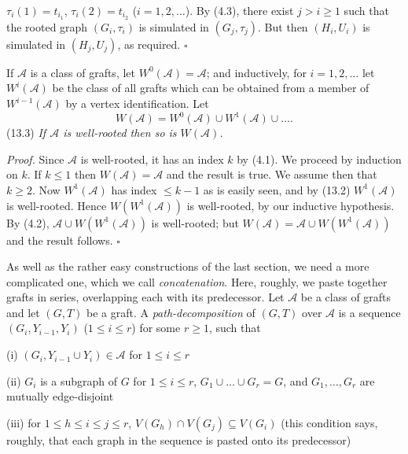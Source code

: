 \noindent $\tau_i(1) = t_{i_1}$, $\tau_i(2) = t_{i_2}$ ($i = 1, 2, \dots$). By (4.3), there exist $j > i \ge 1$ such that the rooted graph $(G_i, \tau_i)$ is simulated in $(G_j, \tau_j)$. But then $(H_i, U_i)$ is simulated in $(H_j, U_j)$, as required. $\square$

If $\mathcal{A}$ is a class of grafts, let $W^0(\mathcal{A}) = \mathcal{A}$; and inductively, for $i = 1, 2, \dots$ let $W^i(\mathcal{A})$ be the class of all grafts which can be obtained from a member of $W^{i-1}(\mathcal{A})$ by a vertex identification. Let
\begin{equation*}
W(\mathcal{A}) = W^0(\mathcal{A}) \cup W^1(\mathcal{A}) \cup \dots.
\end{equation*}
\stmt
(13.3) \textit{If $\mathcal{A}$ is well-rooted then so is $W(\mathcal{A})$.}

\textit{Proof.} Since $\mathcal{A}$ is well-rooted, it has an index $k$ by (4.1). We proceed by induction on $k$. If $k \le 1$ then $W(\mathcal{A}) = \mathcal{A}$ and the result is true. We assume then that $k \ge 2$. Now $W^1(\mathcal{A})$ has index $\le k - 1$ as is easily seen, and by (13.2) $W^1(\mathcal{A})$ is well-rooted. Hence $W(W^1(\mathcal{A}))$ is well-rooted, by our inductive hypothesis. By (4.2), $\mathcal{A} \cup W(W^1(\mathcal{A}))$ is well-rooted; but $W(\mathcal{A}) = \mathcal{A} \cup W(W^1(\mathcal{A}))$ and the result follows. $\square$


As well as the rather easy constructions of the last section, we need a more complicated one, which we call \textit{concatenation}. Here, roughly, we paste together grafts in series, overlapping each with its predecessor. Let $\mathcal{A}$ be a class of grafts and let $(G, T)$ be a graft. A \textit{path-decomposition} of $(G, T)$ over $\mathcal{A}$ is a sequence $(G_i, Y_{i-1}, Y_i)$ ($1 \le i \le r$) for some $r \ge 1$, such that

\hspace*{12pt}(i) $(G_i, Y_{i-1} \cup Y_i) \in \mathcal{A}$ for $1 \le i \le r$

\hspace*{12pt}(ii) $G_i$ is a subgraph of $G$ for $1 \le i \le r$, $G_1 \cup \dots \cup G_r = G$, and $G_1, \dots, G_r$ are mutually edge-disjoint

\hspace*{12pt}(iii) for $1 \le h \le i \le j \le r$, $V(G_h) \cap V(G_j) \subseteq V(G_i)$ (this condition says, roughly, that each graph in the sequence is pasted onto its predecessor)

